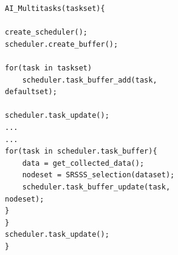 \begin{lstlisting}[language={[ANSI]C},label=update,caption={An example of AI selection and Muti-tasks},keywordstyle=\color{blue!70},showstringspaces=false, commentstyle=\color{red!50!green!80!blue!70},frame=single,captionpos=t, rulesepcolor=\color{red!20!green!20!blue!20}]
AI_Multitasks(taskset){

create_scheduler();
scheduler.create_buffer();

for(task in taskset)
	scheduler.task_buffer_add(task, 
defaultset);

scheduler.task_update();
...
...
for(task in scheduler.task_buffer){
	data = get_collected_data();
	nodeset = SRSSS_selection(dataset);
	scheduler.task_buffer_update(task, 
nodeset);
}
}
scheduler.task_update();
}

\end{lstlisting}

